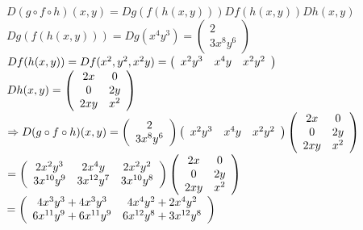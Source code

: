 \documentclass[a4paper]{article}
\begin{document}
$D(g \circ f \circ h)(x,y) = Dg(f(h(x,y)))   Df(h(x,y))   Dh(x,y)$\\

$Dg(f(h(x,y))) = Dg(x^4y^3) = \left(\begin{array}{c} 2 \\ 3x^8y^6 \end{array}\right)$\\

$Df(h(x,y)) = Df(x^2, y^2, x^2y) = \left(\begin{array}{c c c} x^2y^3 & x^4y & x^2y^2 \end{array}\right)$\\

$Dh(x,y) = \left(\begin{array}{c c} 2x & 0 \\ 0 & 2y \\ 2xy & x^2 \end{array}\right)$\\

$\Rightarrow D(g \circ f \circ h)(x,y) = \left(\begin{array}{c} 2 \\ 3x^8y^6 \end{array}\right)   \left(\begin{array}{c c c} x^2y^3 & x^4y & x^2y^2 \end{array}\right)   \left(\begin{array}{c c} 2x & 0 \\ 0 & 2y \\ 2xy & x^2 \end{array}\right)$\\

$= \left(\begin{array}{c c c} 2x^2y^3 & 2x^4y & 2x^2y^2 \\ 3x^{10}y^9 & 3x^{12}y^7 & 3x^{10}y^8 \end{array}\right)   \left(\begin{array}{c c} 2x & 0 \\ 0 & 2y \\ 2xy & x^2 \end{array}\right)$\\

$= \left(\begin{array}{c c} 4x^3y^3 + 4x^3y^3 & 4x^4y^2 + 2x^4y^2 \\ 6x^{11}y^9 + 6x^{11}y^9 & 6x^{12}y^8 + 3x^{12}y^8 \end{array}\right)$\\
\end{document}

